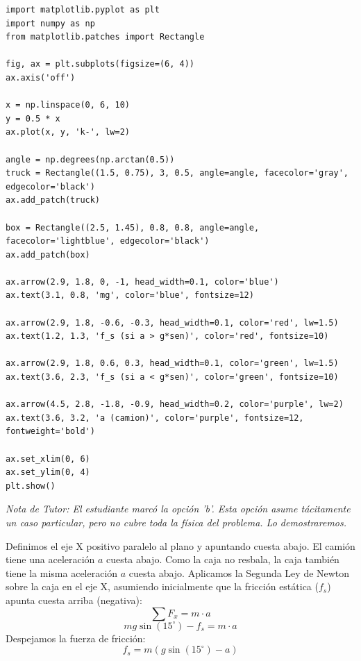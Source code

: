 \documentclass[12pt, a4paper]{article}
\begin{document}
\begin{verbatim}
import matplotlib.pyplot as plt
import numpy as np
from matplotlib.patches import Rectangle

fig, ax = plt.subplots(figsize=(6, 4))
ax.axis('off')

x = np.linspace(0, 6, 10)
y = 0.5 * x
ax.plot(x, y, 'k-', lw=2)

angle = np.degrees(np.arctan(0.5))
truck = Rectangle((1.5, 0.75), 3, 0.5, angle=angle, facecolor='gray', edgecolor='black')
ax.add_patch(truck)

box = Rectangle((2.5, 1.45), 0.8, 0.8, angle=angle, facecolor='lightblue', edgecolor='black')
ax.add_patch(box)

ax.arrow(2.9, 1.8, 0, -1, head_width=0.1, color='blue')
ax.text(3.1, 0.8, 'mg', color='blue', fontsize=12)

ax.arrow(2.9, 1.8, -0.6, -0.3, head_width=0.1, color='red', lw=1.5)
ax.text(1.2, 1.3, 'f_s (si a > g*sen)', color='red', fontsize=10)

ax.arrow(2.9, 1.8, 0.6, 0.3, head_width=0.1, color='green', lw=1.5)
ax.text(3.6, 2.3, 'f_s (si a < g*sen)', color='green', fontsize=10)

ax.arrow(4.5, 2.8, -1.8, -0.9, head_width=0.2, color='purple', lw=2)
ax.text(3.6, 3.2, 'a (camion)', color='purple', fontsize=12, fontweight='bold')

ax.set_xlim(0, 6)
ax.set_ylim(0, 4)
plt.show()
\end{verbatim}

\textit{Nota de Tutor: El estudiante marcó la opción 'b'. Esta opción asume tácitamente un caso particular, pero no cubre toda la física del problema. Lo demostraremos.}

Definimos el eje X positivo paralelo al plano y apuntando cuesta abajo. El camión tiene una aceleración $a$ cuesta abajo. Como la caja no resbala, la caja también tiene la misma aceleración $a$ cuesta abajo.
Aplicamos la Segunda Ley de Newton sobre la caja en el eje X, asumiendo inicialmente que la fricción estática ($f_s$) apunta cuesta arriba (negativa):
$$ \sum F_x = m \cdot a $$
$$ mg \sin(15^\circ) - f_s = m \cdot a $$
Despejamos la fuerza de fricción:
$$ f_s = m(g \sin(15^\circ) - a) $$
\end{document}
